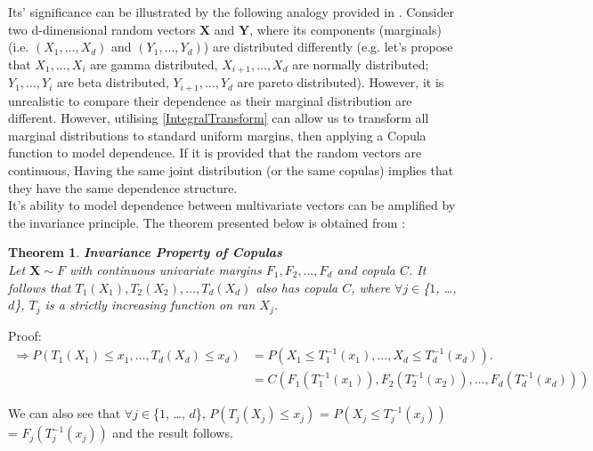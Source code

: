 \documentclass[12pt]{report}
\newtheorem{theorem}{Theorem}[subsection]
\newcommand{\1}{\mathbf{1}}
\begin{document}
\begin{flushleft}
Its' significance can be illustrated by the following analogy provided in \cite{HofertBook}. Consider two d-dimensional random vectors $\textbf{X}$  and $\textbf{Y}$, where its components (marginals) (i.e. $(X_{1}, \dots, X_{d})$ and $(Y_{1}, \dots, Y_{d})$) are distributed differently (e.g. let's propose that $X_{1}, \dots, X_{i}$ are gamma distributed, $X_{i+1}, \dots, X_{d}$ are normally distributed; $Y_{1}, \dots, Y_{i}$ are beta distributed, $Y_{i+1}, \dots, Y_{d}$ are pareto distributed). However, it is unrealistic to compare their dependence as their marginal distribution are different. However, utilising \ref{IntegralTransform} can allow us to transform all marginal distributions to standard uniform margins, then applying a Copula function to model dependence. If it is provided that the random vectors are continuous, Having the same joint distribution (or the same copulas) implies that they have the same dependence structure.\\
\vspace{0.5cm}
It's ability to model dependence between multivariate vectors can be amplified by the invariance principle. The theorem presented below is obtained from \cite{HofertBook}: \\

\newpage
\begin{theorem}\label{CopulaInvariance}
\textbf{Invariance Property of Copulas} \\

Let $\textbf{X} \sim F$ with continuous univariate margins $F_{1}, F_{2}, \dots, F_{d}$ and copula $C$. It follows that $T_{1}(X_{1}), T_{2}(X_{2}), \dots, T_{d}(X_{d})$ also has copula $C$, where $\forall j \in $\{$1$, \dots, $d$\}, $T_{j}$ is a strictly increasing function on ran $X_{j}$. 
\end{theorem}

Proof:
\begin{align*}
\Rightarrow P(T_{1}(X_{1}) \le x_{1}, \dots, T_{d}(X_{d}) \le x_{d}) &= P(X_{1} \le T_{1}^{-1}(x_{1}), \dots, X_{d} \le T_{d}^{-1}(x_{d})).\\
&= C(F_{1}(T^{-1}_{1}(x_{1})),F_{2}(T^{-1}_{2}(x_{2})), \dots, F_{d}(T^{-1}_{d}(x_{d})))
\end{align*}

We can also see that $\forall j \in $\{$1$, \dots, $d$\}, $P(T_{j}(X_{j}) \le x_{j})$ = $P(X_{j} \le T_{j}^{-1}(x_{j}))$ = $F_{j}(T^{-1}_{j}(x_{j}))$
and the result follows.

\vspace{0.5cm}


\end{flushleft}
\end{document}
